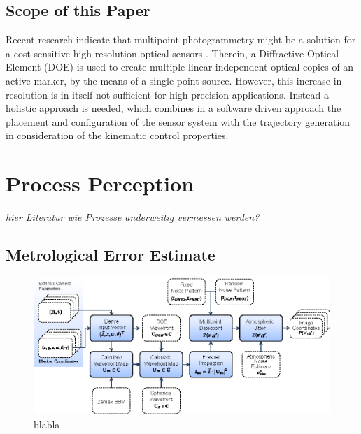 \documentclass[5p,times,procedia]{elsarticle}
\begin{document}
\subsection{Scope of this Paper}
Recent research indicate that multipoint photogrammetry might be a solution for a cost-sensitive high-resolution optical sensors \cite{Hartlieb_2021}. Therein, a Diffractive Optical Element (DOE) is used to create multiple linear independent optical copies of an active marker, by the means of a single point source. However, this increase in
resolution is in itself not sufficient for high precision applications. Instead a holistic approach is needed, which combines in a software driven approach the placement and configuration of the sensor system with the trajectory generation in consideration of the kinematic control properties.


\section{Process Perception}
\textit{hier Literatur wie Prozesse anderweitig vermessen werden?}


\subsection{Metrological Error Estimate}
\label{error_estimate}

\cite{Di_Leo_2011}
\cite{Liu_2021}

\begin{figure}[h]
	\centering
	\includegraphics[width=\columnwidth]{graphics/OpticalSimulation.eps}
	\caption{blabla}
\end{figure}
\end{document}
